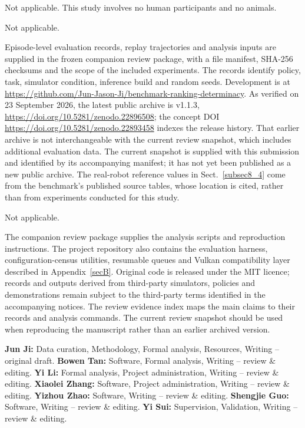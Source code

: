 \documentclass[pdflatex,iicol,sn-apa]{sn-jnl}
\theoremstyle{remark}
\begin{document}
Not applicable. This study involves no human participants and no animals.

Not applicable.

Episode-level evaluation records, replay trajectories and analysis inputs are supplied in the frozen
companion review package, with a file manifest, SHA-256 checksums and the scope of the included
experiments. The records identify policy, task, simulator condition, inference build and random
seeds. Development is at \url{https://github.com/Jun-Jason-Ji/benchmark-ranking-determinacy}.
As verified on 23 September 2026, the latest public archive is v1.1.3,
\url{https://doi.org/10.5281/zenodo.22896508}; the concept DOI
\url{https://doi.org/10.5281/zenodo.22893458} indexes the release history. That earlier archive is
not interchangeable with the current review snapshot, which includes additional evaluation data.
The current snapshot is supplied with this submission and identified by its accompanying manifest;
it has not yet been published as a new public archive. The real-robot reference
values in Sect.~\ref{subsec8_4} come from the benchmark's published source tables, whose location
is cited, rather than from experiments conducted for this study.

Not applicable.

The companion review package supplies the analysis scripts and reproduction instructions. The
project repository also contains the evaluation harness, configuration-census utilities, resumable
queues and Vulkan compatibility layer described in Appendix~\ref{secB}. Original code is released
under the MIT licence; records and outputs derived from third-party simulators, policies and
demonstrations remain subject to the third-party terms identified in the accompanying notices. The review evidence index maps the main claims
to their records and analysis commands. The current review snapshot should be used when reproducing
the manuscript rather than an earlier archived version.

\textbf{Jun Ji:} Data curation, Methodology, Formal analysis, Resources, Writing -- original draft.
\textbf{Bowen Tan:} Software, Formal analysis, Writing -- review \& editing.
\textbf{Yi Li:} Formal analysis, Project administration, Writing -- review \& editing.
\textbf{Xiaolei Zhang:} Software, Project administration, Writing -- review \& editing.
\textbf{Yizhou Zhao:} Software, Writing -- review \& editing.
\textbf{Shengjie Guo:} Software, Writing -- review \& editing.
\textbf{Yi Sui:} Supervision, Validation, Writing -- review \& editing.

\end{document}
